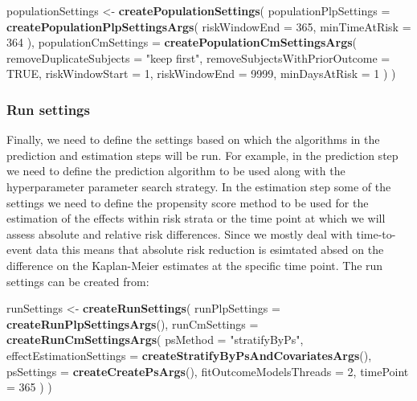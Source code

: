 \documentclass[]{article}
\newenvironment{Shaded}{\begin{snugshade}}{\end{snugshade}}
\newcommand{\DataTypeTok}[1]{\textcolor[rgb]{0.13,0.29,0.53}{#1}}
\newcommand{\DecValTok}[1]{\textcolor[rgb]{0.00,0.00,0.81}{#1}}
\newcommand{\KeywordTok}[1]{\textcolor[rgb]{0.13,0.29,0.53}{\textbf{#1}}}
\newcommand{\NormalTok}[1]{#1}
\newcommand{\OtherTok}[1]{\textcolor[rgb]{0.56,0.35,0.01}{#1}}
\newcommand{\StringTok}[1]{\textcolor[rgb]{0.31,0.60,0.02}{#1}}
\begin{document}
\begin{Shaded}
\begin{Highlighting}[]
\NormalTok{populationSettings <{-}}\StringTok{ }\KeywordTok{createPopulationSettings}\NormalTok{(}
  \DataTypeTok{populationPlpSettings =} \KeywordTok{createPopulationPlpSettingsArgs}\NormalTok{(}
    \DataTypeTok{riskWindowEnd =} \DecValTok{365}\NormalTok{,}
    \DataTypeTok{minTimeAtRisk =} \DecValTok{364}
\NormalTok{  ),}
  \DataTypeTok{populationCmSettings =} \KeywordTok{createPopulationCmSettingsArgs}\NormalTok{(}
    \DataTypeTok{removeDuplicateSubjects =} \StringTok{"keep first"}\NormalTok{,}
    \DataTypeTok{removeSubjectsWithPriorOutcome =} \OtherTok{TRUE}\NormalTok{,}
    \DataTypeTok{riskWindowStart =} \DecValTok{1}\NormalTok{,}
    \DataTypeTok{riskWindowEnd =} \DecValTok{9999}\NormalTok{,}
    \DataTypeTok{minDaysAtRisk =} \DecValTok{1}
\NormalTok{  )}
\NormalTok{)}
\end{Highlighting}
\end{Shaded}

\hypertarget{run-settings}{%
\subsubsection{Run settings}\label{run-settings}}

Finally, we need to define the settings based on which the algorithms in
the prediction and estimation steps will be run. For example, in the
prediction step we need to define the prediction algorithm to be used
along with the hyperparameter parameter search strategy. In the
estimation step some of the settings we need to define the propensity
score method to be used for the estimation of the effects within risk
strata or the time point at which we will assess absolute and relative
risk differences. Since we mostly deal with time-to-event data this
means that absolute risk reduction is esimtated absed on the difference
on the Kaplan-Meier estimates at the specific time point. The run
settings can be created from:

\begin{Shaded}
\begin{Highlighting}[]
\NormalTok{runSettings <{-}}\StringTok{ }\KeywordTok{createRunSettings}\NormalTok{(}
  \DataTypeTok{runPlpSettings =} \KeywordTok{createRunPlpSettingsArgs}\NormalTok{(),}
  \DataTypeTok{runCmSettings =} \KeywordTok{createRunCmSettingsArgs}\NormalTok{(}
    \DataTypeTok{psMethod =} \StringTok{"stratifyByPs"}\NormalTok{,}
    \DataTypeTok{effectEstimationSettings =} \KeywordTok{createStratifyByPsAndCovariatesArgs}\NormalTok{(),}
    \DataTypeTok{psSettings =} \KeywordTok{createCreatePsArgs}\NormalTok{(),}
    \DataTypeTok{fitOutcomeModelsThreads =} \DecValTok{2}\NormalTok{,}
    \DataTypeTok{timePoint =} \DecValTok{365}
\NormalTok{  )}
\NormalTok{)}
\end{Highlighting}
\end{Shaded}
\end{document}
